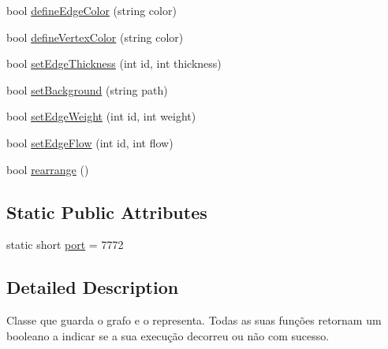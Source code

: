 \begin{DoxyCompactItemize}
\item 
bool \hyperlink{classGraphViewer_a4102580b69826ba83251ef7bb262f8be}{define\-Edge\-Color} (string color)
\item 
bool \hyperlink{classGraphViewer_a76de8676b7a93d72af514b84cdaa4d21}{define\-Vertex\-Color} (string color)
\item 
bool \hyperlink{classGraphViewer_a07f598272fe3515455eab13be749604a}{set\-Edge\-Thickness} (int id, int thickness)
\item 
bool \hyperlink{classGraphViewer_a02437b5fecd8b90de24436068312d593}{set\-Background} (string path)
\item 
bool \hyperlink{classGraphViewer_ac211de009a0afe2e6d44f4f8d030a2cc}{set\-Edge\-Weight} (int id, int weight)
\item 
bool \hyperlink{classGraphViewer_a69eb065145063e4dea41961e92e35c8e}{set\-Edge\-Flow} (int id, int flow)
\item 
bool \hyperlink{classGraphViewer_a3009a66958686ccb7e78b68e37c3c423}{rearrange} ()
\end{DoxyCompactItemize}
\subsection*{Static Public Attributes}
\begin{DoxyCompactItemize}
\item 
static short \hyperlink{classGraphViewer_a89d0abe75f41feededc49497cc514342}{port} = 7772
\end{DoxyCompactItemize}


\subsection{Detailed Description}
Classe que guarda o grafo e o representa. Todas as suas funções retornam um booleano a indicar se a sua execução decorreu ou não com sucesso. 

